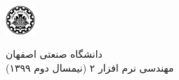 \documentclass{article}
\title{\lr{User Story}}
\author{
	مریم سعیدمهر \\
	شماره دانشجویی : ۹۶۲۹۳۷۳
	\and
	ساجده نیک نداف \\
	شماره دانشجویی : ۹۶۳۷۴۵۳
	\and
	مرضیه علیدادی \\
	شماره دانشجویی : ۹۶۳۱۹۸۳
}
\begin{document}
	
\begin{minipage}{0.1\textwidth}
	\includegraphics[width=1.1cm]{Pic/IUT.png}
\end{minipage}
\hfill
\begin{minipage}{0.9\textwidth}\raggedleft
دانشگاه صنعتی اصفهان\\
مهندسی نرم افزار ۲ (نیمسال دوم ۱۳۹۹)\\
\end{minipage}

\makepertitle

\end{document}
